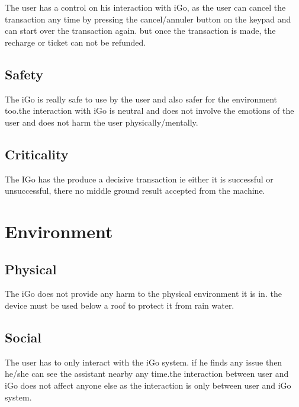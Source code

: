 \documentclass[12pt]{report}
\begin{document}
The user has a control on his interaction with iGo, as the user can cancel the transaction any time by pressing the cancel/annuler button on the keypad and  can start over the transaction again. but once the transaction is made, the recharge or ticket can not be refunded.\par

\subsection{Safety}

The iGo is really safe to use by the user and also safer for the environment too.the interaction with iGo is neutral and does not involve the emotions of the user and does not harm the user physically/mentally.\par


\vspace{\baselineskip}
\subsection{Criticality}

The IGo has the produce a decisive transaction ie either it is successful or unsuccessful, there no middle ground result accepted from the machine.\par



\vspace{\baselineskip}
\section{Environment}

\subsection{Physical}

The iGo does not provide any harm to the physical environment it is in. the device must be used below a roof to protect it from rain water.\par


\vspace{\baselineskip}
\subsection{Social}

The user has to only interact with the iGo system. if he finds any issue then he/she can see the assistant nearby any time.the interaction between user and iGo does not affect anyone else as the interaction is only between user and iGo system.\par
\end{document}

